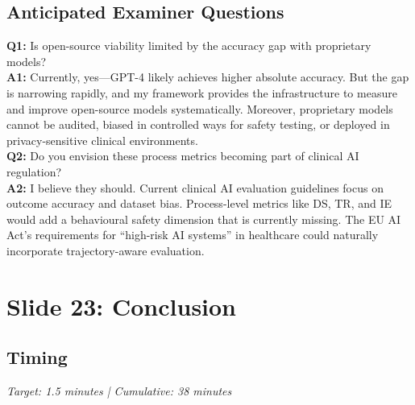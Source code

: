 \documentclass[12pt]{article}
\begin{document}
  \subsection*{Anticipated Examiner Questions}
  \begin{qabox}
  \textbf{Q1:} Is open-source viability limited by the accuracy gap with proprietary models? \\
  \textbf{A1:} Currently, yes---GPT-4 likely achieves higher absolute accuracy. But the gap is narrowing rapidly, and my framework provides the infrastructure to measure and improve open-source models systematically. Moreover, proprietary models cannot be audited, biased in controlled ways for safety testing, or deployed in privacy-sensitive clinical environments. \\[6pt]
  \textbf{Q2:} Do you envision these process metrics becoming part of clinical AI regulation? \\
  \textbf{A2:} I believe they should. Current clinical AI evaluation guidelines focus on outcome accuracy and dataset bias. Process-level metrics like DS, TR, and IE would add a behavioural safety dimension that is currently missing. The EU AI Act's requirements for ``high-risk AI systems'' in healthcare could naturally incorporate trajectory-aware evaluation.
  \end{qabox}



  \section{Slide 23: Conclusion}

  \subsection*{Timing}
  \textit{Target: 1.5 minutes | Cumulative: 38 minutes}
\end{document}
